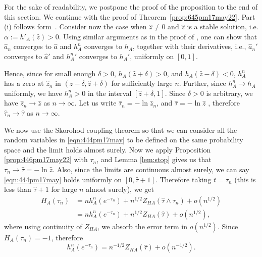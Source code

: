 \documentclass[11pt]{article}
\begin{document}
For the sake of readability, we postpone the proof of the proposition to the end of this section. We continue with the proof of Theorem~\ref{prop:645pm17may22}. Part (i) follows form~\cite{amini10}. Consider now the case when $\widehat{z}\neq0$ and $\widehat{z}$ is a stable solution, i.e. $\alpha:=h'_A(\widehat{z})>0$. Using similar arguments as in the proof of \cite[Lemma 2.3]{janson2008asymptotic}, one can show that  ${\widehat{a}_n}$ converges to ${\widehat{a}}$ and ${h}_A^n$ converges to ${h}_A$, together with their derivatives, i.e., ${\widehat{a}_n}'$ converges to ${\widehat{a}}'$ and ${h_A^n}'$ converges to $h_A'$, uniformly on $[0,1]$. 



Hence, since for small enough $\delta>0$, $h_A(\widehat{z}+\delta)>0$, and $h_A(\widehat{z}-\delta)<0$,  $h_A^n$ has a zero at $\widehat{z}_n$ in $(\widehat{z}-\delta, \widehat{z}+\delta)$ for sufficiently large $n$. Further, since $h_A^n \to h_A$ uniformly, we have $h_A^n>0$ in the interval $[\widehat{z}+\delta,1]$. Since $\delta>0$ is arbitrary, we have $\widehat{z}_n \to \widehat{z}$ as $n\to \infty$. Let us write $\widehat{\tau}_n= -\ln{\widehat{z}_n}$, and $\widehat{\tau}= -\ln{\widehat{z}}$ , therefore $\widehat{\tau}_n\to \widehat{\tau}$ as $n\to\infty$. \par

We now use the Skorohod coupling theorem so that we can consider all the random variables in \eqref{eqn:444pm17may} to be defined on the same probability space and the limit holds almost surely. Now we apply Proposition \ref{prop:446pm17may22} with $\tau_n$, and Lemma \ref{lem:stop} gives us that $\tau_n\to \widehat{\tau}=-\ln{\widehat{z}}$. Also, since the limits are continuous almost surely, we can say \eqref{eqn:444pm17may} holds uniformly on $[0,\widehat{\tau}+1]$. Therefore taking $t  = \tau_n$ (this is less than $\widehat{\tau}+1$ for large $n$ almost surely), we get
\begin{equation}
    \begin{aligned}
    H_A(\tau_n)&= n h_A^n(e^{-\tau_n})+ n^{1/2} Z_{HA}(\widehat{\tau}\wedge \tau_n) +o(n^{1/2})\\
    &= n h_A^n(e^{-\tau_n})+ n^{1/2} Z_{HA}(\widehat{\tau}) +o(n^{1/2}),
    \end{aligned}
\end{equation}
where using continuity of $Z_{HA}$, we absorb the error term in $o(n^{1/2})$. Since $H_A(\tau_n) =-1$, therefore 
\begin{equation}
\label{eqn:529pm17may22}
    h_A^n(e^{-\tau_n}) = n^{-1/2}Z_{HA}(\widehat{\tau}) +o(n^{-1/2}).
\end{equation}
\end{document}
